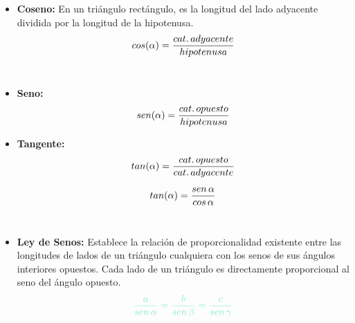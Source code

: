 \documentclass[letterpaper, 12pt]{article}
\begin{document}
    \begin{itemize}\renewcommand{\labelitemi}{$\varphi$}
    
        \item \textbf{Coseno:} En un triángulo rectángulo, es la longitud del lado adyacente dividida por la longitud de la hipotenusa.\\
        
            \begin{equation*}
                cos(\alpha)=\frac{cat.\thinspace adyacente}{hipotenusa}
            \end{equation*}\\
        
         \item \textbf{Seno:}\\
        
            \begin{equation*}
                sen(\alpha)=\frac{cat.\thinspace opuesto}{hipotenusa}
            \end{equation*}
            
        \item \textbf{Tangente:}\\
        
            \begin{equation*}
                tan(\alpha)=\frac{cat.\thinspace opuesto}{cat.\thinspace adyacente}
            \end{equation*}
            
            \begin{equation*}
                tan(\alpha)=\frac{sen\thinspace \alpha}{cos\thinspace \alpha}
            \end{equation*}\\
            
        \item \textbf{Ley de Senos:} Establece la relación de proporcionalidad existente entre las longitudes de lados de un triángulo cualquiera con los senos de sus ángulos interiores opuestos. Cada lado de un triángulo es directamente proporcional al seno del ángulo opuesto.\\
        
            \begin{equation*}
                \textcolor{mygreen}{\frac{a}{sen\thinspace \alpha}=\frac{b}{sen\thinspace \beta}=\frac{c}{sen\thinspace \gamma}}
            \end{equation*}\\
            

\end{itemize}
\end{document}
